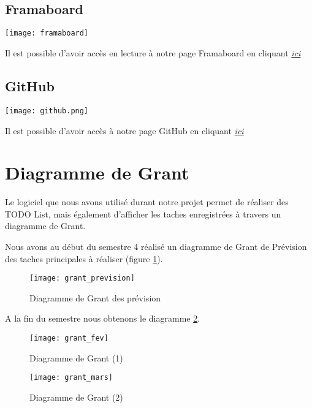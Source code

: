 ~\\
~\\

\subsection{Framaboard}
\begin{center}
\texttt{[image: framaboard]}
\end{center}
Il est possible d'avoir accès en lecture à notre page Framaboard en cliquant  \textit{\href{https://smart.framaboard.org/?controller=board&action=readonly&token=ab1e20bb26472df067dc24cbd84d9b28eea71bfd68bdea07ab5a9b555ce0}{ici}}

\subsection{GitHub}
\begin{center}
\texttt{[image: github.png]}
\end{center}
Il est possible d'avoir accès à notre page GitHub en cliquant  \textit{\href{https://github.com/magichal/SMART}{ici}}






\section{Diagramme de Grant}

Le logiciel que nous avons utilisé durant notre projet permet de réaliser des TODO List, mais également d'afficher les taches enregistrées à travers un diagramme de Grant.

Nous avons au début du semestre 4 réalisé un diagramme de Grant de Prévision des taches principales à réaliser (figure \ref{fig:grant_pre}).

\begin{figure}[h]
  \centering
  \texttt{[image: grant\_prevision]}
  \caption{Diagramme de Grant des prévision}
  \label{fig:grant_pre}
\end{figure}


A la fin du semestre nous obtenons le diagramme  \ref{fig:grant_fev}.
\begin{figure}[h]
  \centering
  \texttt{[image: grant\_fev]}
  \caption{Diagramme de Grant (1)}
  \label{fig:grant_fev}
\end{figure}
\begin{figure}[h]
  \centering
  \texttt{[image: grant\_mars]}
  \caption{Diagramme de Grant (2)}
  \label{fig:grant_mars}
\end{figure}


